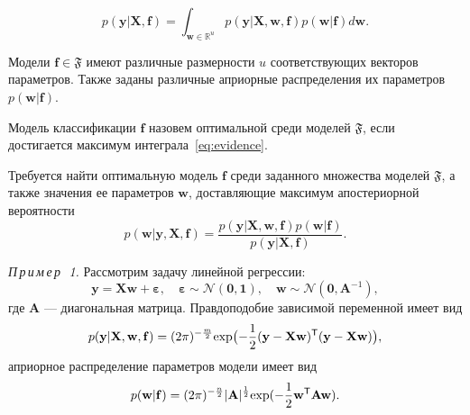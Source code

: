 \begin{equation}
\label{eq:evidence}
	p(\mathbf{y}|\mathbf{X},\mathbf{f}) = \int_{\mathbf{w} \in \mathbb{R}^u} p(\mathbf{y}|\mathbf{X},\mathbf{w}, \mathbf{f})p(\mathbf{w}|\mathbf{f})d\mathbf{w}.
\end{equation}

Модели $\mathbf{f} \in \mathfrak{F}$ имеют различные размерности $u$ соответствующих векторов параметров. Также заданы различные априорные распределения их параметров $p(\mathbf{w}|\mathbf{f})$.


Модель классификации $\mathbf{f}$ назовем оптимальной среди моделей $\mathfrak{F}$, если достигается максимум интеграла~\eqref{eq:evidence}.



Требуется найти оптимальную модель $\mathbf{f}$ среди заданного множества моделей $\mathfrak{F}$, а также значения ее параметров $\mathbf{w}$, доставляющие максимум апостериорной вероятности
\begin{equation}
\label{eq:posterior}
	p(\mathbf{w}|\mathbf{y},\mathbf{X},\mathbf{f}) = \frac{p(\mathbf{y}|\mathbf{X}, \mathbf{w}, \mathbf{f})p(\mathbf{w}|\mathbf{f})}{p(\mathbf{y}|\mathbf{X}, \mathbf{f})}.
\end{equation}


\textsl{П\,р\,и\,м\,е\,р~\,1.} Рассмотрим задачу линейной регрессии:
\[
	\mathbf{y} =\mathbf{X} \mathbf{w} + \boldsymbol{\varepsilon},\quad \boldsymbol{\varepsilon}  \sim \mathcal{N}(\mathbf{0},\mathbf{1}),\quad \mathbf{w} \sim  \mathcal{N}(\mathbf{0},\mathbf{A}^{-1}),
\]
где $\mathbf{A}$ --- диагональная матрица. 
Правдоподобие зависимой переменной имеет вид
\begin{equation}
\label{eq:example1}
	p(\mathbf{y}|  \mathbf{X}, \mathbf{w}, \mathbf{f}) = (2\pi) ^{-\frac{m}{2}} \textnormal{exp} \bigl(-\frac{1}{2}(\mathbf{y} -\mathbf{X} \mathbf{w})^\mathsf{T}(\mathbf{y} - \mathbf{X}\mathbf{w})\bigr),
\end{equation}
априорное распределение параметров модели имеет вид
\begin{equation}
\label{eq:prior}	
p(\mathbf{w}|\mathbf{f}) =  (2\pi) ^{-\frac{n}{2}} |\mathbf{A}|^{\frac{1}{2}} \textnormal{exp} (-\frac{1}{2}\mathbf{w}^\mathsf{T}\mathbf{A}\mathbf{w}).
\end{equation}

